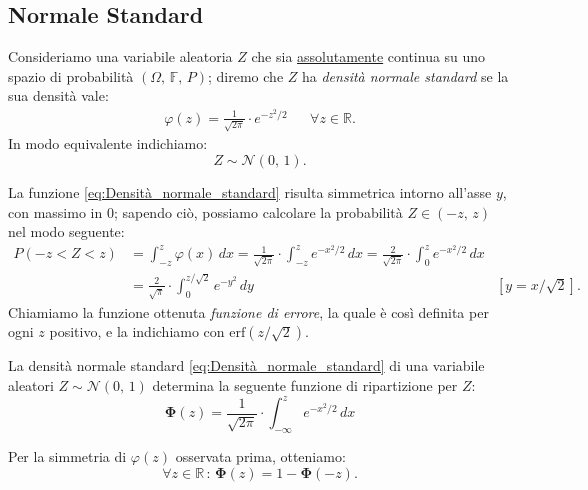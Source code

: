         \subsection{Normale Standard}
            \begin{defn}
                Consideriamo una variabile aleatoria $Z$ che sia \underline{assolutamente} continua su uno spazio di probabilità $(\Omega,\,\mathbb{F},\,P)$; diremo che $Z$ ha \textit{densità normale standard} se la sua densità vale:
                \begin{align}\label{eq:Densità_normale_standard} 
                    \varphi(z) = \frac{1}{\sqrt{2\pi}} \cdot e^{-z^2/2} & &\forall z \in \mathbb{R}
                .\end{align}
                In modo equivalente indichiamo: \[
                    Z \sim \mathcal{N}(0,\, 1)
                .\]
            \end{defn}
            \begin{obsv}
                La funzione \eqref{eq:Densità_normale_standard} risulta simmetrica intorno all'asse $y$, con massimo in 0; sapendo ciò, possiamo calcolare la probabilità $Z \in (-z,\, z)$ nel modo seguente:
                \begin{align*}
                    P(-z < Z < z) &= \int_{-z}^{z} \varphi(x)\, dx = \frac{1}{\sqrt{2\pi}} \cdot \int_{-z}^{z} e^{-x^2/2}\, dx = \frac{2}{\sqrt{2\pi}} \cdot \int_{0}^{z} e^{-x^2/2}\, dx \\
                                  &= \frac{2}{\sqrt{\pi}} \cdot \int_{0}^{z /\sqrt{2}} e^{-y^2}\, dy & [y = x /\sqrt{2}] 
                .\end{align*}
                Chiamiamo la funzione ottenuta \textit{funzione di errore}, la quale è così definita per ogni $z$ positivo, e la indichiamo con $\text{erf}(z /\sqrt{2})$.
            \end{obsv}
            \begin{prty}
                La densità normale standard \eqref{eq:Densità_normale_standard} di una variabile aleatori $Z \sim \mathcal{N}(0,\,1)$ determina la seguente funzione di ripartizione per $Z$:
                \begin{equation}\label{eq:Ripartizione_normale_standard}
                    \mathbf{\Phi}(z) = \frac{1}{\sqrt{2\pi}} \cdot \int_{-\infty}^{z} e^{-x^2 /2}\, dx
                \end{equation}
            \end{prty}
            \begin{obsv}
                Per la simmetria di $\varphi(z)$ osservata prima, otteniamo: \[
                    \forall z \in \mathbb{R} \,:\, \mathbf{\Phi}(z) = 1 - \mathbf{\Phi}(-z)
                .\] 
            \end{obsv}
